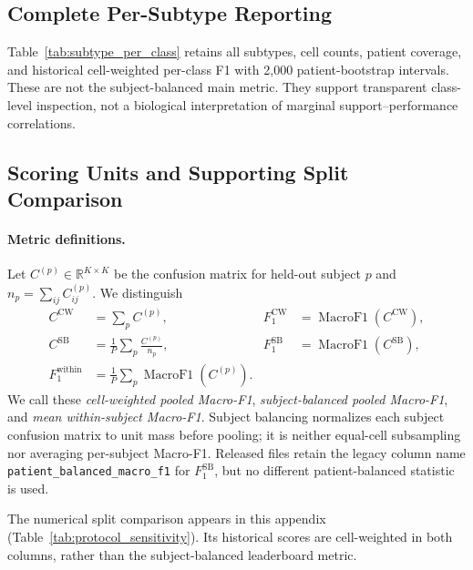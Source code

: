 


\clearpage
\subsection{Complete Per-Subtype Reporting}
\label{sec:appendix:subtype_audit}

Table~\ref{tab:subtype_per_class} retains all \numsubtypes{} subtypes, cell counts,
patient coverage, and historical cell-weighted per-class F1 with 2,000
patient-bootstrap intervals. These are not the subject-balanced main metric.
They support transparent class-level inspection, not a biological
interpretation of marginal support--performance correlations.


\subsection{Scoring Units and Supporting Split Comparison}
\label{sec:appendix:protocol_sensitivity}
\label{sec:results:protocol}

\paragraph{Metric definitions.}
Let $C^{(p)}\in\mathbb{R}^{K\times K}$ be the confusion matrix for held-out
subject $p$ and $n_p=\sum_{ij}C^{(p)}_{ij}$. We distinguish
\begin{align}
C^{\mathrm{CW}} &= \sum_p C^{(p)},
&F_1^{\mathrm{CW}} &= \operatorname{MacroF1}(C^{\mathrm{CW}}),\\
C^{\mathrm{SB}} &= \frac{1}{P}\sum_p\frac{C^{(p)}}{n_p},
&F_1^{\mathrm{SB}} &= \operatorname{MacroF1}(C^{\mathrm{SB}}),\\
F_1^{\mathrm{within}} &= \frac{1}{P}\sum_p
\operatorname{MacroF1}(C^{(p)}). &&
\end{align}
We call these \emph{cell-weighted pooled Macro-F1}, \emph{subject-balanced
pooled Macro-F1}, and \emph{mean within-subject Macro-F1}. Subject balancing
normalizes each subject confusion matrix to unit mass before pooling; it is
neither equal-cell subsampling nor averaging per-subject Macro-F1. Released
files retain the legacy column name \texttt{patient\_balanced\_macro\_f1} for
$F_1^{\mathrm{SB}}$, but no different patient-balanced statistic is used.

The numerical split comparison appears in this appendix
(Table~\ref{tab:protocol_sensitivity}). Its historical scores are cell-weighted
in both columns, rather than the subject-balanced leaderboard metric.

